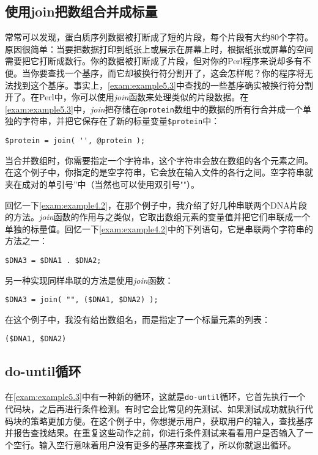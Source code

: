 \subsection{使用join把数组合并成标量}
\label{sect:section5.3.2}
常常可以发现，蛋白质序列数据被打断成了短的片段，每个片段有大约80个字符。原因很简单：当要把数据打印到纸张上或展示在屏幕上时，根据纸张或屏幕的空间需要把它打断成数行。你的数据被打断成了片段，但对你的Perl程序来说却多有不便。当你要查找一个基序，而它却被换行符分割开了，这会怎样呢？你的程序将无法找到这个基序。事实上，\autoref{exam:example5.3}中查找的一些基序确实被换行符分割开了。在Perl中，你可以使用\textit{join}函数来处理类似的片段数据。在\autoref{exam:example5.3}中，\textit{join}把存储在\verb|@protein|数组中的数据的所有行合并成一个单独的字符串，并把它保存在了新的标量变量\verb|$protein|中：

\begin{lstlisting}
$protein = join( '', @protein );
\end{lstlisting}

当合并数组时，你需要指定一个字符串，这个字符串会放在数组的各个元素之间。在这个例子中，你指定的是空字符串，它会放在输入文件的各行之间。空字符串就夹在成对的单引号''中（当然也可以使用双引号""）。


回忆一下\autoref{exam:example4.2}，在那个例子中，我介绍了好几种串联两个DNA片段的方法。\textit{join}函数的作用与之类似，它取出数组元素的变量值并把它们串联成一个单独的标量值。回忆一下\autoref{exam:example4.2}中的下列语句，它是串联两个字符串的方法之一：

\begin{lstlisting}
$DNA3 = $DNA1 . $DNA2;
\end{lstlisting}

另一种实现同样串联的方法是使用\textit{join}函数：

\begin{lstlisting}
$DNA3 = join( "", ($DNA1, $DNA2) );
\end{lstlisting}

在这个例子中，我没有给出数组名，而是指定了一个标量元素的列表：

\begin{lstlisting}
($DNA1, $DNA2)
\end{lstlisting}

\subsection{do-until循环}
在\autoref{exam:example5.3}中有一种新的循环，这就是\verb|do-until|循环，它首先执行一个代码块，之后再进行条件检测。有时它会比常见的先测试、如果测试成功就执行代码块的策略更加方便。在这个例子中，你想提示用户，获取用户的输入，查找基序并报告查找结果。在重复这些动作之前，你进行条件测试来看看用户是否输入了一个空行。输入空行意味着用户没有更多的基序来查找了，所以你就退出循环。

